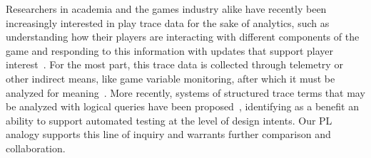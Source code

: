     Researchers in academia and the games industry alike have recently
    been increasingly interested in play trace data for the sake of
    analytics, such as understanding how their players are interacting with
    different components of the game and responding to this information with
    updates that support player interest~\cite{el2013game}. 
    For the most part, this trace data is collected through telemetry or
    other indirect means, like game variable monitoring, after which it
    must be analyzed for meaning~\cite{Canossa2013}. More recently,
    systems of structured trace terms that may be
    analyzed with logical queries have been
    proposed~\cite{osborn2015playspecs}, identifying as a benefit an
    ability to support automated testing at the level of design intents.
    Our PL analogy supports this line of inquiry and warrants
    further comparison and collaboration.

% 
% 
% 




